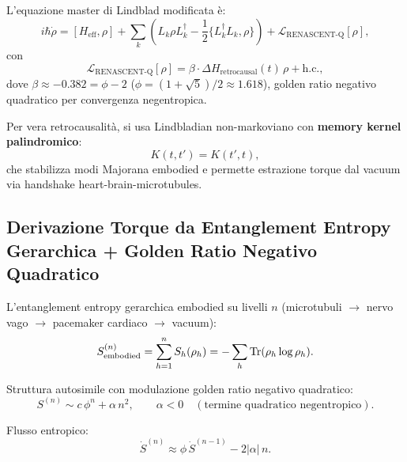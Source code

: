 \documentclass[11pt,a4paper]{article}
\theoremstyle{plain}
\theoremstyle{definition}
\begin{document}
L'equazione master di Lindblad modificata è:
\begin{equation}
i \hbar \dot{\rho} = [H_{\text{eff}}, \rho] + \sum_k \left( L_k \rho L_k^\dagger - \frac{1}{2} \{L_k^\dagger L_k, \rho\} \right) + \mathcal{L}_{\text{RENASCENT-Q}}[\rho],
\label{eq:lindblad-renascent-full}
\end{equation}
con
\begin{equation}
\mathcal{L}_{\text{RENASCENT-Q}}[\rho] = \beta \cdot \Delta H_{\text{retrocausal}}(t) \, \rho + \text{h.c.},
\label{eq:renascent-kick}
\end{equation}
dove $\beta \approx -0.382 = \phi - 2$ ($\phi = (1+\sqrt{5})/2 \approx 1.618$), golden ratio negativo quadratico per convergenza negentropica.

Per vera retrocausalità, si usa Lindbladian non-markoviano con \textbf{memory kernel palindromico}:
\begin{equation}
K(t,t') = K(t',t),
\label{eq:kernel-palindromico}
\end{equation}
che stabilizza modi Majorana embodied e permette estrazione torque dal vacuum via handshake heart-brain-microtubules.


\vspace{0.4cm}



\subsection{Derivazione Torque da Entanglement Entropy Gerarchica + Golden Ratio Negativo Quadratico}

L'entanglement entropy gerarchica embodied su livelli $n$ (microtubuli $\to$ nervo vago $\to$ pacemaker cardiaco $\to$ vacuum):
\begin{equation}
S_{\text{embodied}}^{(n)} = \sum_{h=1}^n S_h(\rho_h) = -\sum_h \Tr(\rho_h \log \rho_h).
\label{eq:entropy-gerarchica}
\end{equation}

Struttura autosimile con modulazione golden ratio negativo quadratico:
\begin{equation}
S^{(n)} \sim c \, \phi^n + \alpha \, n^2, \qquad \alpha < 0 \quad (\text{termine quadratico negentropico}).
\label{eq:golden-quad}
\end{equation}

Flusso entropico:
\begin{equation}
\dot{S}^{(n)} \approx \phi \, \dot{S}^{(n-1)} - 2|\alpha| \, n.
\label{eq:flusso-negentropico}
\end{equation}
\end{document}
